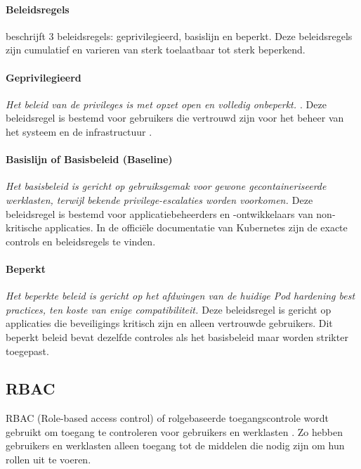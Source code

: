 \paragraph{Beleidsregels}
\textcite{KubernetesDocs-2023} beschrijft 3 beleidsregels: geprivilegieerd, basislijn en beperkt. Deze beleidsregels zijn cumulatief en varieren van sterk toelaatbaar tot sterk beperkend. 

\paragraph{Geprivilegieerd}
\textit{Het beleid van de privileges is met opzet open en volledig onbeperkt. \autocite{KubernetesDocs-2023}}.
Deze beleidsregel is bestemd voor gebruikers die vertrouwd zijn voor het beheer van het systeem en de infrastructuur \autocite{KubernetesDocs-2023}. 

\paragraph{Basislijn of Basisbeleid (Baseline)}
\textit{Het basisbeleid is gericht op gebruiksgemak voor gewone gecontaineriseerde werklasten, terwijl bekende privilege-escalaties worden voorkomen. \autocite{KubernetesDocs-2023}}
Deze beleidsregel is bestemd voor applicatiebeheerders en -ontwikkelaars van non-kritische applicaties.
In de officiële documentatie van Kubernetes zijn de exacte controls en beleidsregels te vinden.

\paragraph{Beperkt}
\textit{Het beperkte beleid is gericht op het afdwingen van de huidige Pod hardening best practices, ten koste van enige compatibiliteit. \autocite{KubernetesDocs-2023}}
Deze beleidsregel is gericht op applicaties die beveiligings kritisch zijn en alleen vertrouwde gebruikers. 
Dit beperkt beleid bevat dezelfde controles als het basisbeleid maar worden strikter toegepast.

\subsection{RBAC}
RBAC (Role-based access control) of rolgebaseerde toegangscontrole wordt gebruikt om toegang te controleren voor gebruikers en werklasten \autocite{nordell2022systematic}.
Zo hebben gebruikers en werklasten alleen toegang tot de middelen die nodig zijn om hun rollen uit te voeren.

